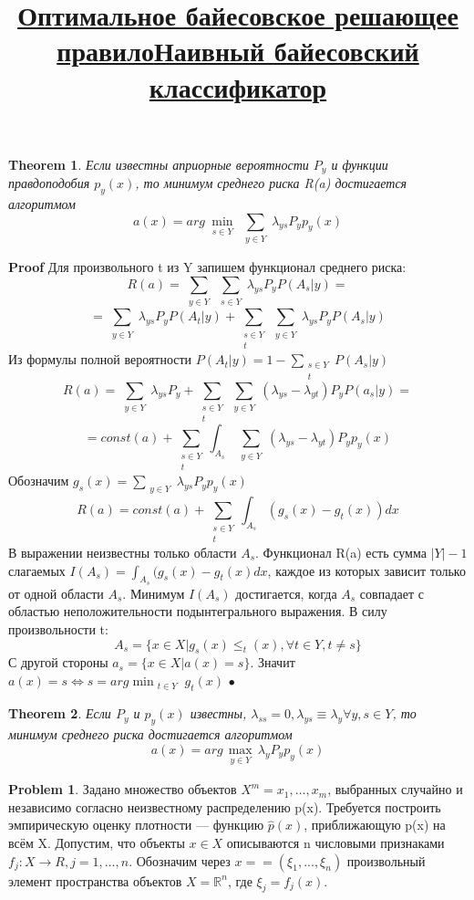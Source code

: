 \documentclass[a4paper]{article}
\theoremstyle{plain}
\newtheorem{theorem}{Theorem}
\theoremstyle{remark}
\theoremstyle{definition}
\newtheorem{problem}{Problem}
\renewenvironment{proof}{{\bfseries Proof}}{$\bullet$}
\newcommand{\setR}{\mathbb{R}}
\renewcommand{\leq}{\leqslant}
\newcommand{\bigtitle}[1]{\title{\textbf{\underline{#1}}}}
\begin{document}
\bigtitle{Оптимальное байесовское решающее правило}
\begin{theorem}
Если известны априорные вероятности $P_y$ и функции правдоподобия $p_y(x)$, то минимум среднего риска R(a) достигается алгоритмом
$$a(x) = arg \min_{\substack{s \in Y}} \sum_{\substack{y \in Y}} \lambda_{ys} P_y p_y(x) $$
\end{theorem}
\begin{proof} Для произвольного t из Y запишем функционал среднего риска:
$$ R(a) = \sum_{\substack{y \in Y}} \sum_{\substack{s \in Y}}\lambda_{ys} P_y P(A_s|y) = $$
$$ = \sum_{\substack{y \in Y}}\lambda_{ys} P_y P(A_t|y) + \sum_{\substack{s \in Y\\{t}}} \sum_{\substack{y \in Y}}\lambda_{ys} P_y P(A_s|y)  $$
Из формулы полной вероятности $ P(A_t|y) = 1- \sum_{\substack{s \in Y\\{t}}}P(A_s|y) $
$$ R(a) = \sum_{\substack{y \in Y}}\lambda_{ys} P_y + \sum_{\substack{s \in Y\\{t}}} \sum_{\substack{y \in Y}}(\lambda_{ys} - \lambda_{yt}) P_y P(a_s|y) = $$
$$ = const(a) +  \sum_{\substack{s \in Y\\{t}}} \int_{A_s} \sum_{\substack{y \in Y}}(\lambda_{ys} - \lambda_{yt}) P_y p_y(x)$$
Обозначим $ g_s(x) =  \sum_{\substack{y \in Y}}\lambda_{ys} P_y p_y(x)$
$$ R(a) = const(a) +  \sum_{\substack{s \in Y\\{t}}} \int_{A_s} (g_s(x) - g_t(x))dx $$
В выражении неизвестны только области $A_s$. Функционал R(a) есть сумма $|Y|-1$ слагаемых $I(A_s) = \int_{A_s}(g_s(x) - g_t(x)dx$, каждое из которых зависит только от одной области $A_s$. Минимум $I(A_s)$ достигается, когда $A_s$ совпадает с областью неположительности подынтегрального выражения. В силу произвольности t:
$$ A_s = \{x \in X|g_s(x) \leq _t(x), \forall t \in Y, t \neq s\} $$
С другой стороны $a_s = \{x \in X| a(x)=s\}$. Значит $a(x) = s \iff s = arg \min_{\substack{t \in Y}} g_t(x)$
\end{proof}
\begin{theorem}
Если $P_y$ и $p_y(x)$ известны, $\lambda_{ss}=0, \lambda_{ys} \equiv \lambda_y \forall y,s \in Y$, то минимум среднего риска достигается алгоритмом
$$ a(x) = arg \max_{\substack{y \in Y}} \lambda_y P_y p_y(x) $$
\end{theorem}
\bigtitle{Наивный байесовский классификатор}
\begin{problem} Задано множество объектов $X^m = {x_1, \ldots , x_m}$, выбранных случайно и независимо согласно неизвестному распределению p(x). Требуется построить эмпирическую оценку плотности — функцию $\hat{p}(x)$, приближающую p(x) на всём X.
Допустим, что объекты $x \in X$ описываются n числовыми признаками $f_j: X \rightarrow R, j = 1, \ldots, n$. Обозначим через $x =
= (\xi_1, . . . , \xi_n)$ произвольный элемент пространства объектов $X = \setR^n$, где $\xi_j = f_j (x)$.
\end{problem}
\end{document}
